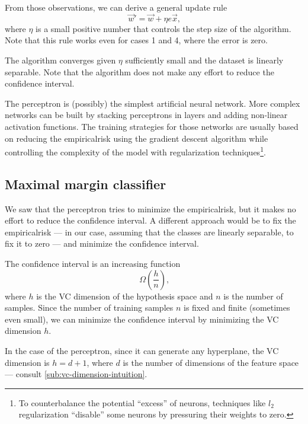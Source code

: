 From those observations, we can derive a general update rule
\[
  \vec{w}' = \vec{w} + \eta e \vec{x}\text{,}
\]
where $\eta$ is a small positive number that controls the step size of the algorithm.
Note that this rule works even for cases 1 and 4, where the error is zero.

The algorithm converges given $\eta$ sufficiently small and the dataset is linearly
separable.  Note that the algorithm does not make any effort to reduce the confidence
interval.

The perceptron is (possibly) the simplest artificial neural network.  More complex
networks can be built by stacking perceptrons in layers and adding non-linear activation
functions.  The training strategies for those networks are usually based on reducing the
\gls{empiricalrisk} using the gradient descent algorithm while controlling the complexity of
the model with \gls{regularization} techniques\footnote{To counterbalance the potential
``excess'' of neurons, techniques like $l_2$ regularization ``disable'' some neurons by
pressuring their weights to zero.}.%


\subsection{Maximal margin classifier}

We saw that the perceptron tries to minimize the \gls{empiricalrisk}, but it makes no effort to
reduce the confidence interval.  A different approach would be to fix the \gls{empiricalrisk}
--- in our case, assuming that the classes are linearly separable, to fix it to zero --- and
minimize the confidence interval.

The confidence interval is an increasing function
\[
  \Omega\!\left(\frac{h}{n}\right)\text{,}
\]
where $h$ is the VC dimension of the hypothesis space and $n$ is the number of samples.
Since the number of training samples $n$ is fixed and finite (sometimes even small), we
can minimize the confidence interval by minimizing the VC dimension $h$.

In the case of the perceptron, since it can generate any hyperplane, the VC dimension is
$h = d + 1$, where $d$ is the number of dimensions of the feature space --- consult
\cref{sub:vc-dimension-intuition}.

